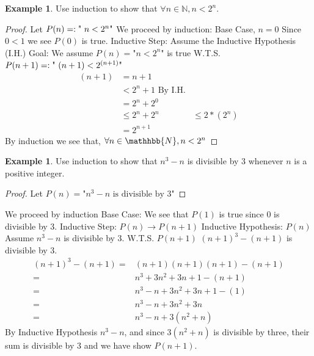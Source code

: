 \documentclass[letterpaper,10pt]{article}
\theoremstyle{plain}
\theoremstyle{definition}
\newtheorem{exmp}[thm]{Example}
\theoremstyle{remark}
\begin{document}
\begin{exmp}
Use induction to show that $\forall n\in \mathbb{N}, n< 2^n$.
\begin{proof}
Let $P(n)=:\text{" $ n< 2^n$"}$
\newline
We proceed by induction:
\newline
Base Case, $n=0$
\newline
Since $0<1$ we see $P(0)$ is true. 
\newline
Inductive Step:
\newline
Assume the Inductive Hypothesis (I.H.)
\newline
Goal:
\newline
We assume $P(n)=\text{"$n<2^n$"}$ is true
\newline
W.T.S. $P(n+1)=:\text{" $ (n+1)< 2^{(n+1)}$"}$
\newline
\begin{align}
(n+1)&=n+1\\
    &<2^n+1 \text{ By I.H.}\\
    &=2^n+2^0\\
    &\leq 2^n+2^n
    &\leq 2*(2^n)\\
    &=2^{n+1}
\end{align}
By induction we see that,
$\forall n \in \mathhbb{N}, n<2^n$

\end{proof}

\end{exmp}
\begin{exmp}
Use induction to show that $n^3-n$ is divisible by 3 whenever $n$ is a positive integer. 
\begin{proof}
Let $P(n)=\text{"$n^3-n$ is divisible by 3"}$
\newline

\end{proof}
We proceed by induction
\newline
Base Case:
\newline
We see that $P(1)$ is true since 0 is divisible by 3.
\newline
Inductive Step: $P(n)\to P(n+1)$
\newline
Inductive Hypothesis: $P(n)$
\newline
Assume $n^3-n$ is divisible by 3.
\newline
W.T.S. $P(n+1)$
\newline
$(n+1)^3-(n+1)$ is divisible by 3.
\newline
\begin{align}
(n+1)^3-(n+1)=&(n+1)(n+1)(n+1)-(n+1)\\
=&n^3+3n^2+3n+1-(n+1)\\
=&n^3-n +3n^2+3n+1-(1)\\
=&n^3-n +3n^2+3n\\
=&n^3-n +3(n^2+n)
\end{align}
By Inductive Hypothesis $n^3-n$, and since $3(n^2+n)$ is divisible by three, their sum is divisible by 3 and we have show $P(n+1)$.
\end{exmp}
\newpage
\end{document}
